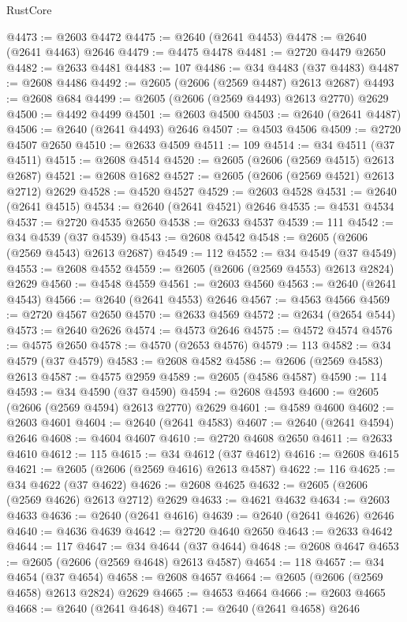\begin{lexlean}{RustCore}
\begin{coremodule}
@4473 := @2603 @4472
@4475 := @2640 (@2641 @4453)
@4478 := @2640 (@2641 @4463) @2646
@4479 := @4475 @4478
@4481 := @2720 @4479 @2650
@4482 := @2633 @4481
@4483 := 107
@4486 := @34 @4483 (@37 @4483)
@4487 := @2608 @4486
@4492 := @2605 (@2606 (@2569 @4487) @2613 @2687)
@4493 := @2608 @684
@4499 := @2605 (@2606 (@2569 @4493) @2613 @2770) @2629
@4500 := @4492 @4499
@4501 := @2603 @4500
@4503 := @2640 (@2641 @4487)
@4506 := @2640 (@2641 @4493) @2646
@4507 := @4503 @4506
@4509 := @2720 @4507 @2650
@4510 := @2633 @4509
@4511 := 109
@4514 := @34 @4511 (@37 @4511)
@4515 := @2608 @4514
@4520 := @2605 (@2606 (@2569 @4515) @2613 @2687)
@4521 := @2608 @1682
@4527 := @2605 (@2606 (@2569 @4521) @2613 @2712) @2629
@4528 := @4520 @4527
@4529 := @2603 @4528
@4531 := @2640 (@2641 @4515)
@4534 := @2640 (@2641 @4521) @2646
@4535 := @4531 @4534
@4537 := @2720 @4535 @2650
@4538 := @2633 @4537
@4539 := 111
@4542 := @34 @4539 (@37 @4539)
@4543 := @2608 @4542
@4548 := @2605 (@2606 (@2569 @4543) @2613 @2687)
@4549 := 112
@4552 := @34 @4549 (@37 @4549)
@4553 := @2608 @4552
@4559 := @2605 (@2606 (@2569 @4553) @2613 @2824) @2629
@4560 := @4548 @4559
@4561 := @2603 @4560
@4563 := @2640 (@2641 @4543)
@4566 := @2640 (@2641 @4553) @2646
@4567 := @4563 @4566
@4569 := @2720 @4567 @2650
@4570 := @2633 @4569
@4572 := @2634 (@2654 @544)
@4573 := @2640 @2626
@4574 := @4573 @2646
@4575 := @4572 @4574
@4576 := @4575 @2650
@4578 := @4570 (@2653 @4576)
@4579 := 113
@4582 := @34 @4579 (@37 @4579)
@4583 := @2608 @4582
@4586 := @2606 (@2569 @4583) @2613
@4587 := @4575 @2959
@4589 := @2605 (@4586 @4587)
@4590 := 114
@4593 := @34 @4590 (@37 @4590)
@4594 := @2608 @4593
@4600 := @2605 (@2606 (@2569 @4594) @2613 @2770) @2629
@4601 := @4589 @4600
@4602 := @2603 @4601
@4604 := @2640 (@2641 @4583)
@4607 := @2640 (@2641 @4594) @2646
@4608 := @4604 @4607
@4610 := @2720 @4608 @2650
@4611 := @2633 @4610
@4612 := 115
@4615 := @34 @4612 (@37 @4612)
@4616 := @2608 @4615
@4621 := @2605 (@2606 (@2569 @4616) @2613 @4587)
@4622 := 116
@4625 := @34 @4622 (@37 @4622)
@4626 := @2608 @4625
@4632 := @2605 (@2606 (@2569 @4626) @2613 @2712) @2629
@4633 := @4621 @4632
@4634 := @2603 @4633
@4636 := @2640 (@2641 @4616)
@4639 := @2640 (@2641 @4626) @2646
@4640 := @4636 @4639
@4642 := @2720 @4640 @2650
@4643 := @2633 @4642
@4644 := 117
@4647 := @34 @4644 (@37 @4644)
@4648 := @2608 @4647
@4653 := @2605 (@2606 (@2569 @4648) @2613 @4587)
@4654 := 118
@4657 := @34 @4654 (@37 @4654)
@4658 := @2608 @4657
@4664 := @2605 (@2606 (@2569 @4658) @2613 @2824) @2629
@4665 := @4653 @4664
@4666 := @2603 @4665
@4668 := @2640 (@2641 @4648)
@4671 := @2640 (@2641 @4658) @2646

\end{coremodule}
\end{lexlean}
